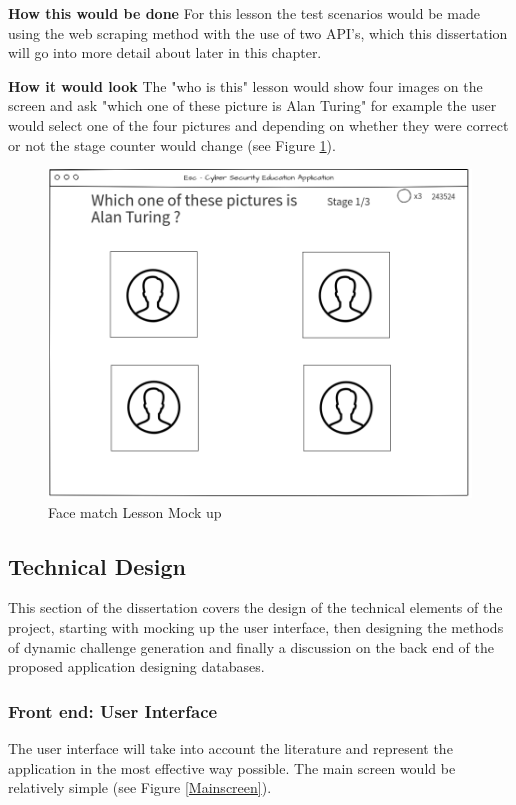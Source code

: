 \documentclass[12pt,a4paper]{article}
\begin{document}
\textbf{How this would be done}  
\newline For this lesson the test scenarios would be made using the web scraping method with the use of two API's, which this dissertation will go into more detail about later in this chapter.  

\textbf{How it would look}  
The "who is this" lesson would show four images on the screen and ask "which one of these picture is Alan Turing" for example the user would select one of the four pictures and depending on whether they were correct or not the stage counter would change (see Figure \ref{facemock}).
\begin{figure}[h]
    \centering
    \includegraphics[width=1.0\textwidth]{Figs/facemock.PNG} 
    \caption{Face match Lesson Mock up} 
    \label{facemock}
\end{figure}  


\subsection{Technical Design}  
This section of the dissertation covers the design of the technical elements of the project, starting with mocking up the user interface, then designing the methods of dynamic challenge generation and finally a discussion on the back end of the proposed application designing databases. 

\subsubsection{Front end: User Interface}  
The user interface will take into account the literature and represent the application in the most effective way possible. The main screen would be relatively simple (see Figure \ref{Mainscreen}).
\end{document}

